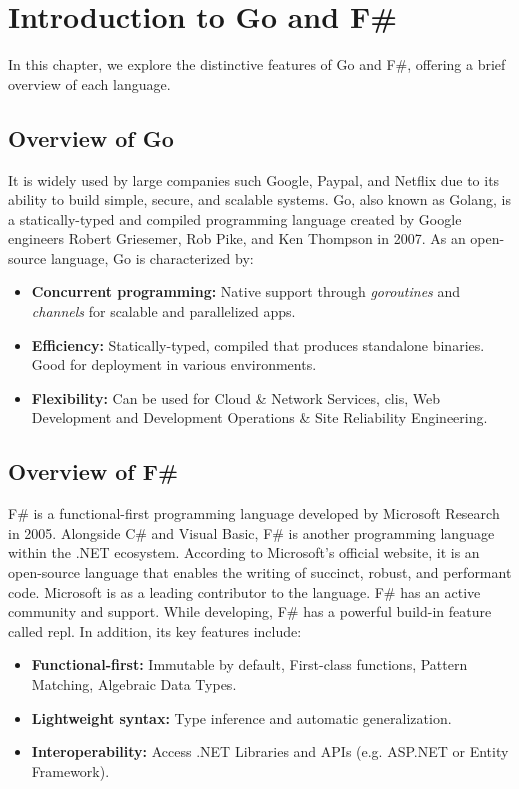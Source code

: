 
\chapter{Introduction to Go and F\#}\label{chap:introgoandfsharp}
In this chapter, we explore the distinctive features of Go and F\#, offering a brief overview of each language.

    \section{Overview of Go}\label{sec:go-overview}
    It is widely used by large companies such Google, Paypal, and Netflix due to its ability to build simple, secure, and scalable systems. Go, also known as Golang, is a statically-typed and compiled programming language created by Google engineers Robert Griesemer, Rob Pike, and Ken Thompson in 2007. As an open-source language, Go is characterized by: 
    \begin{itemize}
        \item \textbf{Concurrent programming:}  Native support through \textit{goroutines} and \textit{channels} for scalable and parallelized \ac{app}s.
        \item \textbf{Efficiency:} Statically-typed, compiled that produces standalone binaries. Good for deployment in various environments.
        \item \textbf{Flexibility:} Can be used for Cloud \& Network Services, \ac{cli}s, Web Development and Development Operations \& Site Reliability Engineering.
    \end{itemize}
    \cite{Gowebsite}

    \section{Overview of F\#}\label{sec:fsharp-overview}
    F\# is a functional-first programming language developed by Microsoft Research in 2005. Alongside C\# and Visual Basic, F\# is another programming language within the .NET ecosystem. According to Microsoft's official website, it is an open-source language that enables the writing of succinct, robust, and performant code. Microsoft is as a leading contributor to the language. F\# has an active community and support.\cite{Fsharpfoundation} While developing, F\# has a powerful build-in feature called \ac{repl}. In addition, its key features include:
    \begin{itemize}
        \item \textbf{Functional-first:} Immutable by default, First-class functions, Pattern Matching, Algebraic Data Types.
        \item \textbf{Lightweight syntax:} Type inference and automatic generalization.
        \item \textbf{Interoperability:} Access .NET Libraries and APIs (e.g. ASP.NET or Entity Framework).
    \end{itemize}\cite{Dotnet, Keyfeaturesfsharp}


